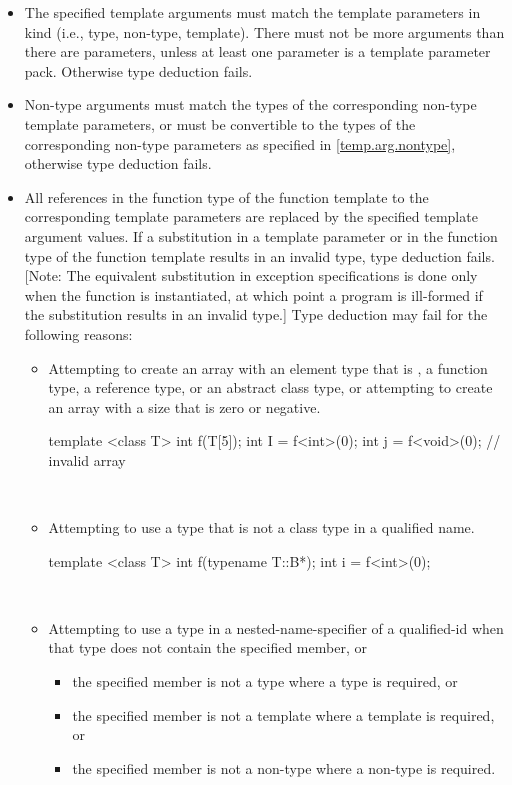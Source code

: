 \documentclass[american]{book}
\begin{document}
\begin{paras}
\begin{itemize}
\item
The specified template arguments must match the template parameters in
kind (i.e., type, non-type, template). There must not be more
arguments than there are parameters, unless at least one parameter is
a template parameter pack. Otherwise type deduction fails.
\item
Non-type arguments must match the types of the corresponding non-type
template parameters, or must be convertible to the types of the
corresponding non-type parameters as specified in
\ref{temp.arg.nontype}, otherwise type deduction fails.
\item
All references in the function type  of the function template to the
corresponding template parameters are replaced by the specified
template argument values.  If a substitution in a template
parameter
or in the function type of the function template results in an invalid
type, type deduction fails.  [Note: The equivalent substitution in
exception specifications is done only when the function is
instantiated, at which point a program is ill-formed if the
substitution results in an invalid type.] Type deduction may fail for
the following reasons:

\begin{itemize}
\item
Attempting to create an array with an element type that is , a
function type, a reference type, or an abstract class type, or attempting
to create an array with a size that is zero or negative.
\enterexample\ 

\begin{codeblock}
template <class T> int f(T[5]);
int I = f<int>(0);
int j = f<void>(0);             // invalid array
\end{codeblock}
\exitexample\ 
\item
Attempting to use a type that is not a class type in a qualified name.
\enterexample\ 

\begin{codeblock}
template <class T> int f(typename T::B*);
int i = f<int>(0);
\end{codeblock}
\exitexample\ 
\item
Attempting to use a type in a nested-name-specifier of a qualified-id when
that type does not contain the specified member, or
\begin{itemize}
\item
the specified member is not a type where a type is required, or
\item
the specified member is not a template where a template is required, or
\item
the specified member is not a non-type where a non-type is
required.
\end{itemize}
\enterexample\ 


\end{itemize}
\end{itemize}
\end{paras}
\end{document}
